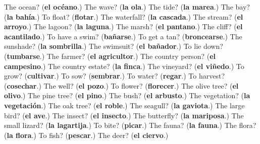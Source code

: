 \begin{tcolorbox}[breakable,colback=teal!4,colframe=teal!35!black,title={Before you move on}]
The ocean? (\textbf{el océano}.) The wave? (\textbf{la ola}.) The tide? (\textbf{la marea}.) The bay? (\textbf{la bahía}.) To float? (\textbf{flotar}.) The waterfall? (\textbf{la cascada}.) The stream? (\textbf{el arroyo}.) The lagoon? (\textbf{la laguna}.) The marsh? (\textbf{el pantano}.) The cliff? (\textbf{el acantilado}.) To have a swim? (\textbf{bañarse}.) To get a tan? (\textbf{broncearse}.) The sunshade? (\textbf{la sombrilla}.) The swimsuit? (\textbf{el bañador}.) To lie down? (\textbf{tumbarse}.) The farmer? (\textbf{el agricultor}.) The country person? (\textbf{el campesino}.) The country estate? (\textbf{la finca}.) The vineyard? (\textbf{el viñedo}.) To grow? (\textbf{cultivar}.) To sow? (\textbf{sembrar}.) To water? (\textbf{regar}.) To harvest? (\textbf{cosechar}.) The well? (\textbf{el pozo}.) To flower? (\textbf{florecer}.) The olive tree? (\textbf{el olivo}.) The pine tree? (\textbf{el pino}.) The bush? (\textbf{el arbusto}.) The vegetation? (\textbf{la vegetación}.) The oak tree? (\textbf{el roble}.) The seagull? (\textbf{la gaviota}.) The large bird? (\textbf{el ave}.) The insect? (\textbf{el insecto}.) The butterfly? (\textbf{la mariposa}.) The small lizard? (\textbf{la lagartija}.) To bite? (\textbf{picar}.) The fauna? (\textbf{la fauna}.) The flora? (\textbf{la flora}.) To fish? (\textbf{pescar}.) The deer? (\textbf{el ciervo}.)
\end{tcolorbox}
